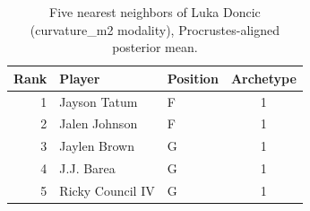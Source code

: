 \begin{table}[htbp]
  \centering\small
  \begin{tabular}{rllc}
    \toprule
    Rank & Player & Position & Archetype \\
    \midrule
    1 & Jayson Tatum & F & 1 \\
    2 & Jalen Johnson & F & 1 \\
    3 & Jaylen Brown & G & 1 \\
    4 & J.J. Barea & G & 1 \\
    5 & Ricky Council IV & G & 1 \\
    \bottomrule
  \end{tabular}
  \caption{Five nearest neighbors of Luka Doncic (curvature_m2 modality), Procrustes-aligned posterior mean.}
  \label{tab:Luka_Doncic_neighbors_curvature_m2}
\end{table}

